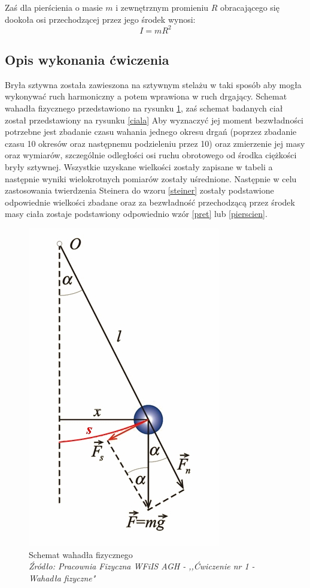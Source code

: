 \documentclass[a4paper,12pts]{article}
\begin{document}
	Zaś dla pierścienia o masie $m$ i zewnętrznym promieniu $R$ obracającego się dookoła osi przechodzącej przez jego środek wynosi:
	\begin{equation}
		I = mR^2
		\label{pierscien}
	\end{equation}

	
	
	
	\subsection{Opis wykonania ćwiczenia}
	Bryła sztywna została zawieszona na sztywnym stelażu w taki sposób aby mogła wykonywać ruch harmoniczny a potem wprawiona w ruch drgający. Schemat wahadła fizycznego przedstawiono na rysunku \ref{wahadlo}, zaś schemat badanych ciał został przedstawiony na rysunku \ref{ciala} Aby wyznaczyć jej moment bezwładności potrzebne jest zbadanie czasu wahania jednego okresu drgań (poprzez zbadanie czasu 10 okresów oraz następnemu podzieleniu przez 10) oraz zmierzenie jej masy oraz wymiarów, szczególnie odległości osi ruchu obrotowego od środka ciężkości bryły sztywnej. Wszystkie uzyskane wielkości zostały zapisane w tabeli a następnie wyniki wielokrotnych pomiarów zostały uśrednione. Następnie w celu zastosowania twierdzenia Steinera do wzoru \ref{steiner} zostały podstawione odpowiednie wielkości zbadane oraz za bezwładność przechodzącą przez środek masy ciała zostaje podstawiony odpowiednio wzór \ref{pret} lub \ref{pierscien}.
	
	\begin{figure}[!h]
		\centering
		\includegraphics[scale=0.5]{wahadlo.png}
		\caption{Schemat wahadła fizycznego \\ \textit{Źródło: Pracownia Fizyczna WFiIS AGH - ,,Ćwiczenie nr 1 - Wahadła fizyczne"}}
		\label{wahadlo}
	\end{figure}
\newpage
\end{document}
